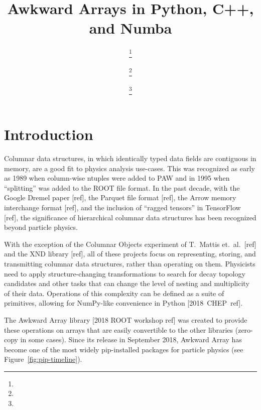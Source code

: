 \documentclass{webofc}
\begin{document}
\title{Awkward Arrays in Python, C++, and Numba}

\author{%
 \fnsep\thanks{} \and
{} \fnsep\thanks{} \and
{} \fnsep\thanks{}}



\maketitle

\section{Introduction}

Columnar data structures, in which identically typed data fields are contiguous in memory, are a good fit to physics analysis use-cases. This was recognized as early as 1989 when column-wise ntuples were added to PAW and in 1995 when ``splitting'' was added to the ROOT file format. In the past decade, with the Google Dremel paper [ref], the Parquet file format [ref], the Arrow memory interchange format [ref], and the inclusion of ``ragged tensors'' in TensorFlow [ref], the significance of hierarchical columnar data structures has been recognized beyond particle physics.

With the exception of the Columnar Objects experiment of T.\ Mattis et.\ al.\ [ref] and the XND library [ref], all of these projects focus on representing, storing, and transmitting columnar data structures, rather than operating on them. Physicists need to apply structure-changing transformations to search for decay topology candidates and other tasks that can change the level of nesting and multiplicity of their data. Operations of this complexity can be defined as a suite of primitives, allowing for NumPy-like convenience in Python \mbox{[2018 CHEP ref].\hspace{-1 cm}}

The Awkward Array library [2018 ROOT workshop ref] was created to provide these operations on arrays that are easily convertible to the other libraries (zero-copy in some cases). Since its release in September 2018, Awkward Array has become one of the most widely pip-installed packages for particle physics (see Figure~\ref{fig:pip-timeline}).
\end{document}
